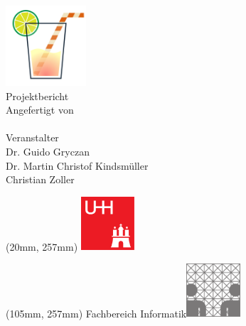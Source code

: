 \makeatletter
\thispagestyle{empty}

\begin{center}
	\textcolor{kiba}{\bf\sffamily\fontsize{48pt}{48pt}\selectfont \@title} \\[.5cm]
	\includegraphics[height=3cm]{logo-kiba} \\[.5cm]
	\textcolor{kiba}{\LARGE\sffamily Projektbericht} \\[.5cm]
    {\large\sffamily Angefertigt von} \\[4pt]
    {\Large \@author \\[1.5cm]}
    {\large\sffamily Veranstalter} \\[12pt]
    {\Large Dr. Guido Gryczan} \\[6pt] {\LARGE Dr. Martin Christof Kindsmüller\vphantom{y}} \\[6pt] {\LARGE Christian Zoller} \\[1.5cm]
    {\Large\sffamily \@date}
\end{center}

\vspace{2.5cm}

\begin{textblock*}{85mm}(20mm, 257mm)
	\includegraphics[width=2cm]{logo-uhh}
\end{textblock*}

\begin{textblock*}{85mm}(105mm, 257mm)
	\hfill{\sffamily Fachbereich Informatik}\;\includegraphics[width=2cm]{logo-fbi}
\end{textblock*}

\makeatother